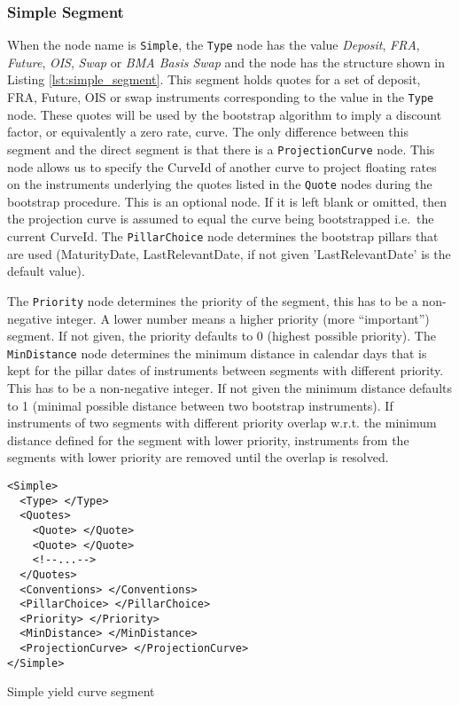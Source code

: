 \subsubsection*{Simple Segment}
When the node name is \lstinline!Simple!, the \lstinline!Type! node has the value \emph{Deposit}, \emph{FRA},
\emph{Future}, \emph{OIS}, \emph{Swap} or \emph{BMA Basis Swap} and the node has the structure shown in Listing
\ref{lst:simple_segment}. This segment holds quotes for a set of deposit, FRA, Future, OIS or swap instruments
corresponding to the value in the \lstinline!Type! node. These quotes will be used by the bootstrap algorithm to imply a
discount factor, or equivalently a zero rate, curve. The only difference between this segment and the direct segment is
that there is a \lstinline!ProjectionCurve! node. This node allows us to specify the CurveId of another curve to project
floating rates on the instruments underlying the quotes listed in the \lstinline!Quote! nodes during the bootstrap
procedure. This is an optional node. If it is left blank or omitted, then the projection curve is assumed to equal the
curve being bootstrapped i.e.\ the current CurveId. The \lstinline!PillarChoice! node determines the bootstrap pillars
that are used (MaturityDate, LastRelevantDate, if not given 'LastRelevantDate' is the default value).

The \lstinline!Priority! node determines the priority of the segment, this has to be a non-negative integer. A lower
number means a higher priority (more ``important'') segment. If not given, the priority defaults to 0 (highest possible
priority). The \lstinline!MinDistance! node determines the minimum distance in calendar days that is kept for the pillar
dates of instruments between segments with different priority. This has to be a non-negative integer. If not given the
minimum distance defaults to 1 (minimal possible distance between two bootstrap instruments). If instruments of two
segments with different priority overlap w.r.t. the minimum distance defined for the segment with lower priority,
instruments from the segments with lower priority are removed until the overlap is resolved.

\begin{listing}[H]
\begin{verbatim}
<Simple>
  <Type> </Type>
  <Quotes>
    <Quote> </Quote>
    <Quote> </Quote>
    <!--...-->
  </Quotes>
  <Conventions> </Conventions>
  <PillarChoice> </PillarChoice>
  <Priority> </Priority>
  <MinDistance> </MinDistance>
  <ProjectionCurve> </ProjectionCurve>
</Simple>
\end{verbatim}
\caption{Simple yield curve segment}
\label{lst:simple_segment}
\end{listing}

